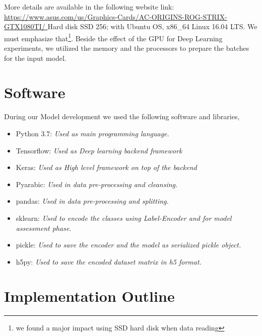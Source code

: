 More details are available in the following website link: \url{https://www.asus.com/us/Graphics-Cards/AC-ORIGINS-ROG-STRIX-GTX1080TI/ }
Hard disk SSD 256; with Ubuntu OS, x86\_64 Linux 16.04 LTS. We must emphasize that\footnote{we found a major impact using SSD hard disk when data reading}. Beside the effect of the GPU for Deep Learning experiments, we utilized the memory and the processors to prepare the batches for the input model.

\section{Software}

During our Model development we used the following software and libraries,

\begin{itemize}
 \item Python 3.7: \textit{Used as main programming language.}
 \item Tensorflow: \textit{Used as Deep learning backend framework}
 \item Keras: \textit{Used as High level framework on top of the backend}
 \item Pyarabic: \textit{Used in data pre-processing and cleansing.}
 \item pandas: \textit{Used in data pre-processing and splitting.}
 \item sklearn: \textit{Used to encode the classes using Label-Encoder and for model assessment phase.}
 \item pickle: \textit{Used to save the encoder and the model as serialized pickle object.}
 \item h5py: \textit{Used to save the encoded dataset matrix in h5 format.}
\end{itemize}

\section{Implementation Outline}

